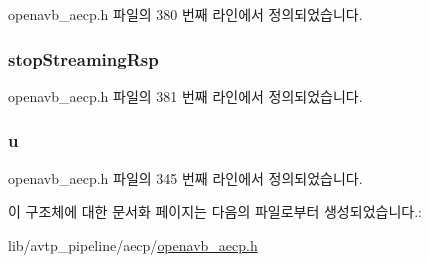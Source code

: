 openavb\+\_\+aecp.\+h 파일의 380 번째 라인에서 정의되었습니다.

\subsubsection[{\texorpdfstring{stop\+Streaming\+Rsp}{stopStreamingRsp}}]{ stop\+Streaming\+Rsp}\hypertarget{structopenavb__aecp__entity__model__data__unit__t_ab90ef72aa7eeb7b85b42441aa80f5678}{}\label{structopenavb__aecp__entity__model__data__unit__t_ab90ef72aa7eeb7b85b42441aa80f5678}


openavb\+\_\+aecp.\+h 파일의 381 번째 라인에서 정의되었습니다.

\subsubsection[{\texorpdfstring{u}{u}}]{ u}\hypertarget{structopenavb__aecp__entity__model__data__unit__t_a9dc54b317bbb4de0e9975e4f535f4a62}{}\label{structopenavb__aecp__entity__model__data__unit__t_a9dc54b317bbb4de0e9975e4f535f4a62}


openavb\+\_\+aecp.\+h 파일의 345 번째 라인에서 정의되었습니다.



이 구조체에 대한 문서화 페이지는 다음의 파일로부터 생성되었습니다.\+:\begin{DoxyCompactItemize}
\item 
lib/avtp\+\_\+pipeline/aecp/\hyperlink{openavb__aecp_8h}{openavb\+\_\+aecp.\+h}\end{DoxyCompactItemize}
